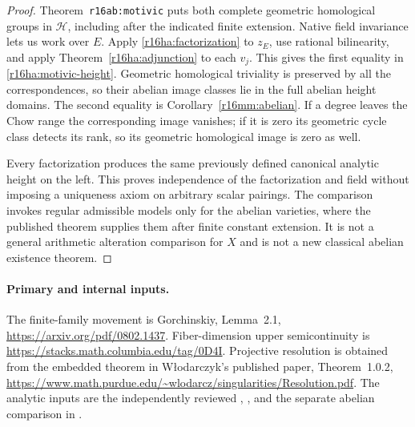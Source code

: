 \begin{proof}
Theorem~\texttt{r16ab:motivic} puts both complete geometric
homological groups in $\mathcal H$, including after the indicated
finite extension. Native field invariance lets us work over $E$.
Apply \eqref{r16ha:factorization} to $z_E$, use rational
bilinearity, and apply Theorem~\ref{r16ha:adjunction} to each
$v_j$. This gives the first equality in
\eqref{r16ha:motivic-height}. Geometric homological triviality
is preserved by all the correspondences, so their abelian
image classes lie in the full abelian height domains.
The second equality is Corollary~\ref{r16mm:abelian}.
If a degree leaves the Chow range the corresponding image
vanishes; if it is zero its geometric cycle class detects its
rank, so its geometric homological image is zero as well.

Every factorization produces the same previously defined
canonical analytic height on the left. This proves independence
of the factorization and field without imposing a uniqueness
axiom on arbitrary scalar pairings. The comparison invokes
regular admissible models only for the abelian varieties,
where the published theorem supplies them after finite constant
extension. It is not a general arithmetic alteration comparison
for $X$ and is not a new classical abelian existence theorem.
\end{proof}

\paragraph{Primary and internal inputs.}
The finite-family movement is Gorchinskiy, Lemma~2.1,
\url{https://arxiv.org/pdf/0802.1437}. Fiber-dimension
upper semicontinuity is
\url{https://stacks.math.columbia.edu/tag/0D4I}.
Projective resolution is obtained from the embedded theorem
in W\l odarczyk's published paper, Theorem~1.0.2,
\url{https://www.math.purdue.edu/~wlodarcz/singularities/Resolution.pdf}.
The analytic inputs are the independently reviewed
,
,
and the separate abelian comparison in
.
